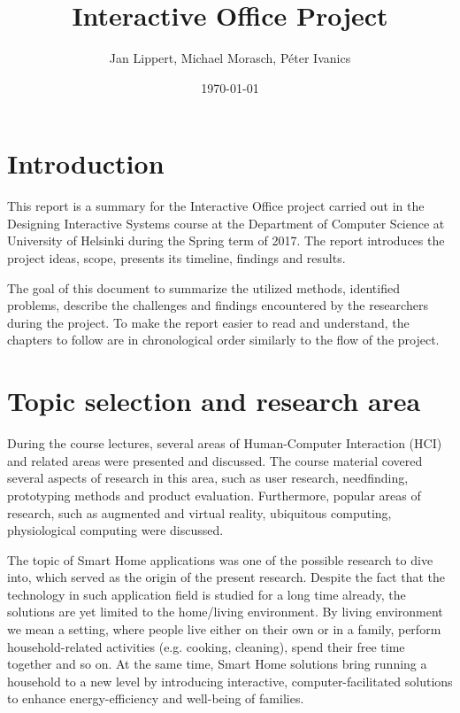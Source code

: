 \documentclass[english]{tktltiki}
\begin{document}
\onehalfspacing

\title{Interactive Office Project}
\author{Jan Lippert, Michael Morasch, Péter Ivanics}
\date{\today}

\maketitle

\mytableofcontents

\section{Introduction}

This report is a summary for the Interactive Office project carried out in the Designing Interactive Systems course at the Department of Computer Science at University of Helsinki during the Spring term of 2017. The report introduces the project ideas, scope, presents its timeline, findings and results.

The goal of this document to summarize the utilized methods, identified problems, describe the challenges and findings encountered by the researchers during the project. To make the report easier to read and understand, the chapters to follow are in chronological order similarly to the flow of the project.

\section{Topic selection and research area}
During the course lectures, several areas of Human-Computer Interaction (HCI) and related areas were presented and discussed. The course material covered several aspects of research in this area, such as user research, needfinding, prototyping methods and product evaluation. Furthermore, popular areas of research, such as augmented and virtual reality, ubiquitous computing, physiological computing were discussed. 

The topic of Smart Home applications was one of the possible research to dive into, which served as the origin of the present research. Despite the fact that the technology in such application field is studied for a long time already, the solutions are yet limited to the home/living environment. By living environment we mean a setting, where people live either on their own or in a family, perform household-related activities (e.g. cooking, cleaning), spend their free time together and so on. At the same time, Smart Home solutions bring running a household to a new level by introducing interactive, computer-facilitated solutions to enhance energy-efficiency and well-being of families. 
\end{document}
